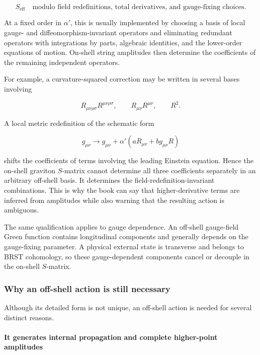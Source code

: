 \documentclass[
  10pt,
  a4paper,
  openany]{book}
\begin{document}
\[
\boxed{
S_{\mathrm{eff}}
\quad\text{modulo field redefinitions, total derivatives, and gauge-fixing choices.}
}
\]

At a fixed order in \(\alpha'\), this is usually implemented by choosing
a basis of local gauge- and diffeomorphism-invariant operators and
eliminating redundant operators with integrations by parts, algebraic
identities, and the lower-order equations of motion. On-shell string
amplitudes then determine the coefficients of the remaining independent
operators.

For example, a curvature-squared correction may be written in several
bases involving

\[
R_{\mu\nu\rho\sigma}R^{\mu\nu\rho\sigma},
\qquad
R_{\mu\nu}R^{\mu\nu},
\qquad
R^2.
\]

A local metric redefinition of the schematic form

\[
g_{\mu\nu}
\longrightarrow
g_{\mu\nu}
+\alpha'\left(aR_{\mu\nu}+b g_{\mu\nu}R\right)
\]

shifts the coefficients of terms involving the leading Einstein
equation. Hence the on-shell graviton \(S\)-matrix cannot determine all
three coefficients separately in an arbitrary off-shell basis. It
determines the field-redefinition-invariant combinations. This is why
the book can say that higher-derivative terms are inferred from
amplitudes while also warning that the resulting action is ambiguous.

The same qualification applies to gauge dependence. An off-shell
gauge-field Green function contains longitudinal components and
generally depends on the gauge-fixing parameter. A physical external
state is transverse and belongs to BRST cohomology, so these
gauge-dependent components cancel or decouple in the on-shell
\(S\)-matrix.

\subsubsection{Why an off-shell action is still
necessary}\label{why-an-off-shell-action-is-still-necessary}

Although its detailed form is not unique, an off-shell action is needed
for several distinct reasons.

\paragraph{It generates internal propagation and complete higher-point
amplitudes}\label{it-generates-internal-propagation-and-complete-higher-point-amplitudes}
\end{document}
